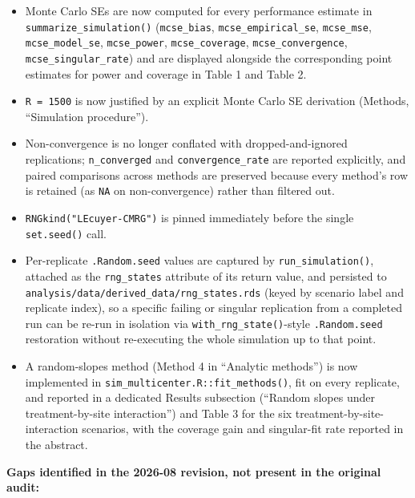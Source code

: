 \documentclass[
  11pt,
]{article}
\providecommand{\tightlist}{%
  \setlength{\itemsep}{0pt}\setlength{\parskip}{0pt}}
\begin{document}
\begin{itemize}
\tightlist
\item
  Monte Carlo SEs are now computed for every performance estimate in
  \texttt{summarize\_simulation()} (\texttt{mcse\_bias}, \texttt{mcse\_empirical\_se},
  \texttt{mcse\_mse}, \texttt{mcse\_model\_se}, \texttt{mcse\_power}, \texttt{mcse\_coverage},
  \texttt{mcse\_convergence}, \texttt{mcse\_singular\_rate}) and are displayed
  alongside the corresponding point estimates for power and coverage
  in Table 1 and Table 2.
\item
  \texttt{R\ =\ 1500} is now justified by an explicit Monte Carlo SE
  derivation (Methods, ``Simulation procedure'').
\item
  Non-convergence is no longer conflated with dropped-and-ignored
  replications; \texttt{n\_converged} and \texttt{convergence\_rate} are reported
  explicitly, and paired comparisons across methods are preserved
  because every method's row is retained (as \texttt{NA} on non-convergence)
  rather than filtered out.
\item
  \texttt{RNGkind("L\textquotesingle{}Ecuyer-CMRG")} is pinned immediately before the single
  \texttt{set.seed()} call.
\item
  Per-replicate \texttt{.Random.seed} values are captured by
  \texttt{run\_simulation()}, attached as the \texttt{rng\_states} attribute of its
  return value, and persisted to
  \texttt{analysis/data/derived\_data/rng\_states.rds} (keyed by scenario label
  and replicate index), so a specific failing or singular replication
  from a completed run can be re-run in isolation via
  \texttt{with\_rng\_state()}-style \texttt{.Random.seed} restoration without
  re-executing the whole simulation up to that point.
\item
  A random-slopes method (Method 4 in ``Analytic methods'') is now
  implemented in \texttt{sim\_multicenter.R::fit\_methods()}, fit on every
  replicate, and reported in a dedicated Results subsection
  (``Random slopes under treatment-by-site interaction'') and Table 3
  for the six treatment-by-site-interaction scenarios, with the
  coverage gain and singular-fit rate reported in the abstract.
\end{itemize}

\textbf{Gaps identified in the 2026-08 revision, not present in the
original audit:}
\end{document}
